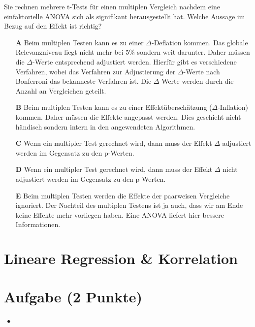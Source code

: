 \documentclass[a4paper, 9pt]{scrartcl}\usepackage[]{graphicx}\usepackage[]{xcolor}
\begin{document}
Sie rechnen mehrere t-Tests für einen multiplen Vergleich nachdem eine einfaktorielle ANOVA sich als signifikant herausgestellt hat. Welche Aussage im Bezug auf den Effekt ist richtig? 



\begin{enumerate}
\item [\textbf{A} \msquare] Beim multiplen Testen kann es zu einer $\Delta$-Deflation kommen. Das globale Relevanzniveau liegt nicht mehr bei $5\%$ sondern weit darunter. Daher müssen die $\Delta$-Werte entsprechend adjustiert werden. Hierfür gibt es verschiedene Verfahren, wobei das Verfahren zur Adjustierung der $\Delta$-Werte nach Bonferroni das bekanneste Verfahren ist. Die $\Delta$-Werte werden durch die Anzahl an Vergleichen geteilt.
\item [\textbf{B} \msquare] Beim multiplen Testen kann es zu einer Effektüberschätzung ($\Delta$-Inflation) kommen. Daher müssen die Effekte angepasst werden. Dies geschieht nicht händisch sondern intern in den angewendeten Algorithmen.
\item [\textbf{C} \msquare] Wenn ein multipler Test gerechnet wird, dann muss der Effekt $\Delta$ adjustiert werden im Gegensatz zu den p-Werten.
\item [\textbf{D} \msquare] Wenn ein multipler Test gerechnet wird, dann muss der Effekt $\Delta$ nicht adjustiert werden im Gegensatz zu den p-Werten.
\item [\textbf{E} \msquare] Beim multiplen Testen werden die Effekte der paarweisen Vergleiche ignoriert. Der Nachteil des multiplen Testens ist ja auch, dass wir am Ende keine Effekte mehr vorliegen haben. Eine ANOVA liefert hier bessere Informationen.
\end{enumerate}
\section*{Lineare Regression \& Korrelation}

\section{Aufgabe \hfill (2 Punkte)}

\ifcollection
\begin{flushright}
\tiny\vspace{-2Ex}
\textbf{\examinhaltstart}
\exammodulestatversuch $\;\bullet$
\exammodulebiostat
\vspace{-1Ex}
\end{flushright}
\fi
\end{document}
